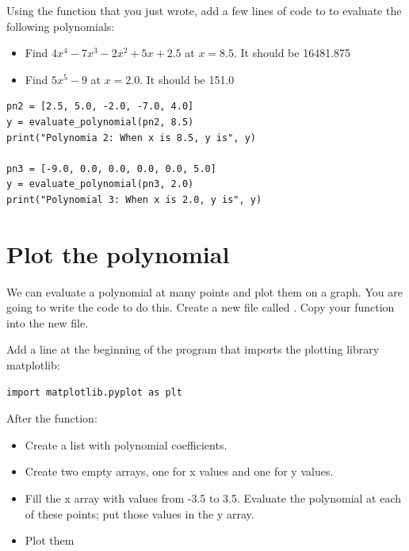 \begin{Exercise}[title={Evaluate Polynomials}, label=pyevalpolynomials]
Using the function that you just wrote, add a few lines of code to
 to evaluate the following polynomials:
\begin{itemize}
\item Find $4x^4 - 7x^3 - 2x^2 + 5x + 2.5$ at $x = 8.5$.  It should be 16481.875
\item Find $5x^5 - 9$ at $x = 2.0$.  It should be 151.0
\end{itemize}
\end{Exercise}
\begin{Answer}[ref=pyevalpolynomials]
\begin{Verbatim}
pn2 = [2.5, 5.0, -2.0, -7.0, 4.0]
y = evaluate_polynomial(pn2, 8.5)
print("Polynomia 2: When x is 8.5, y is", y)

pn3 = [-9.0, 0.0, 0.0, 0.0, 0.0, 5.0]
y = evaluate_polynomial(pn3, 2.0)
print("Polynomial 3: When x is 2.0, y is", y)    
\end{Verbatim} 
\end{Answer}

\section{Plot the polynomial}

We can evaluate a polynomial at many points and plot them on a
graph. You are going to write the code to do this.  Create a new file
called . Copy your 
function into the new file.

Add a line at the beginning of the program that imports the plotting library matplotlib:
\begin{Verbatim}
import matplotlib.pyplot as plt
\end{Verbatim}

After the  function:
\begin{itemize}
\item Create a list with polynomial coefficients.
\item Create two empty arrays, one for x values and one for y values.
\item Fill the x array with values from -3.5 to 3.5. Evaluate the polynomial at each of these points; put those values
  in the y array.
\item Plot them
\end{itemize}

